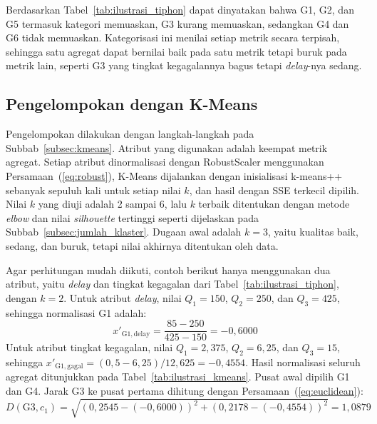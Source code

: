Berdasarkan Tabel~\ref{tab:ilustrasi_tiphon} dapat dinyatakan bahwa G1, G2, dan G5 termasuk kategori memuaskan, G3 kurang memuaskan, sedangkan G4 dan G6 tidak memuaskan. Kategorisasi ini menilai setiap metrik secara terpisah, sehingga satu agregat dapat bernilai baik pada satu metrik tetapi buruk pada metrik lain, seperti G3 yang tingkat kegagalannya bagus tetapi \textit{delay}-nya sedang.

\subsection{Pengelompokan dengan K-Means}
Pengelompokan dilakukan dengan langkah-langkah pada Subbab~\ref{subsec:kmeans}. Atribut yang digunakan adalah keempat metrik agregat. Setiap atribut dinormalisasi dengan RobustScaler menggunakan Persamaan~(\ref{eq:robust}), K-Means dijalankan dengan inisialisasi k-means++ sebanyak sepuluh kali untuk setiap nilai $k$, dan hasil dengan SSE terkecil dipilih. Nilai $k$ yang diuji adalah 2 sampai 6, lalu $k$ terbaik ditentukan dengan metode \textit{elbow} dan nilai \textit{silhouette} tertinggi seperti dijelaskan pada Subbab~\ref{subsec:jumlah_klaster}. Dugaan awal adalah $k = 3$, yaitu kualitas baik, sedang, dan buruk, tetapi nilai akhirnya ditentukan oleh data.

Agar perhitungan mudah diikuti, contoh berikut hanya menggunakan dua atribut, yaitu \textit{delay} dan tingkat kegagalan dari Tabel~\ref{tab:ilustrasi_tiphon}, dengan $k = 2$. Untuk atribut \textit{delay}, nilai $Q_1 = 150$, $Q_2 = 250$, dan $Q_3 = 425$, sehingga normalisasi G1 adalah:
\begin{equation*}
x'_{\mathrm{G1,delay}} = \frac{85 - 250}{425 - 150} = -0{,}6000
\end{equation*}
Untuk atribut tingkat kegagalan, nilai $Q_1 = 2{,}375$, $Q_2 = 6{,}25$, dan $Q_3 = 15$, sehingga $x'_{\mathrm{G1,gagal}} = (0{,}5 - 6{,}25)/12{,}625 = -0{,}4554$. Hasil normalisasi seluruh agregat ditunjukkan pada Tabel~\ref{tab:ilustrasi_kmeans}. Pusat awal dipilih G1 dan G4. Jarak G3 ke pusat pertama dihitung dengan Persamaan~(\ref{eq:euclidean}):
\begin{equation*}
D(\mathrm{G3}, c_1) = \sqrt{(0{,}2545 - (-0{,}6000))^2 + (0{,}2178 - (-0{,}4554))^2} = 1{,}0879
\end{equation*}

